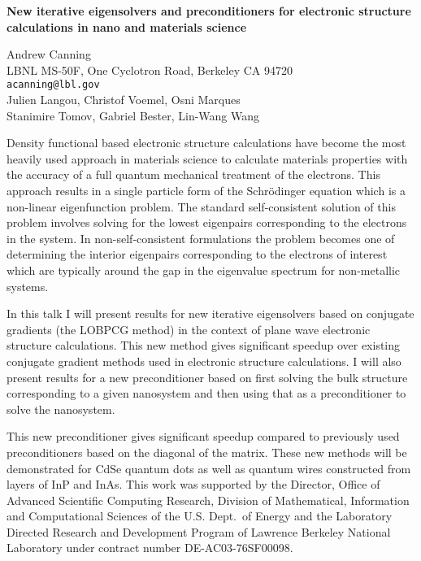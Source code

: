 \documentclass[twosided]{report}
\begin{document}
\begin{center}
{\large			%
{\bf New iterative eigensolvers and preconditioners for electronic structure calculations in nano and materials science}}

	Andrew Canning \\
	LBNL MS-50F, One Cyclotron Road, Berkeley CA 94720 \\
	{\tt acanning@lbl.gov} \\
	Julien Langou, Christof Voemel, Osni Marques \\
	Stanimire Tomov, Gabriel Bester, Lin-Wang Wang
\end{center}
Density functional based electronic structure calculations
have become the most heavily used approach in materials
science to calculate materials properties with the accuracy
of a full quantum mechanical treatment of the electrons.
This approach results in a single particle form of the
Schr\"{o}dinger equation which is a non-linear eigenfunction
problem. The standard self-consistent solution of this
problem involves solving for the lowest eigenpairs
corresponding to the electrons in the system. In
non-self-consistent formulations the problem becomes one of
determining the interior eigenpairs corresponding to the
electrons of interest which are typically around the gap in
the eigenvalue spectrum for non-metallic systems.

In this
talk I will present results for new iterative eigensolvers
based on conjugate gradients (the LOBPCG method) in the
context of plane wave electronic structure calculations.
This new method gives significant speedup over existing
conjugate gradient methods used in electronic structure
calculations.
I will also present results for a new
preconditioner based on first solving the bulk structure
corresponding to a given nanosystem and then using that as a
preconditioner to solve the nanosystem.

This new
preconditioner gives significant speedup compared to
previously used preconditioners based on the diagonal of the
matrix. These new methods will be demonstrated for CdSe
quantum dots as well as quantum wires constructed from
layers of InP and InAs.  This work was supported by the
Director, Office of Advanced Scientific Computing Research,
Division of Mathematical, Information and Computational
Sciences of the U.S. Dept.~of Energy and the Laboratory
Directed Research and Development Program of Lawrence
Berkeley National Laboratory under contract number
DE-AC03-76SF00098.
\end{document}
